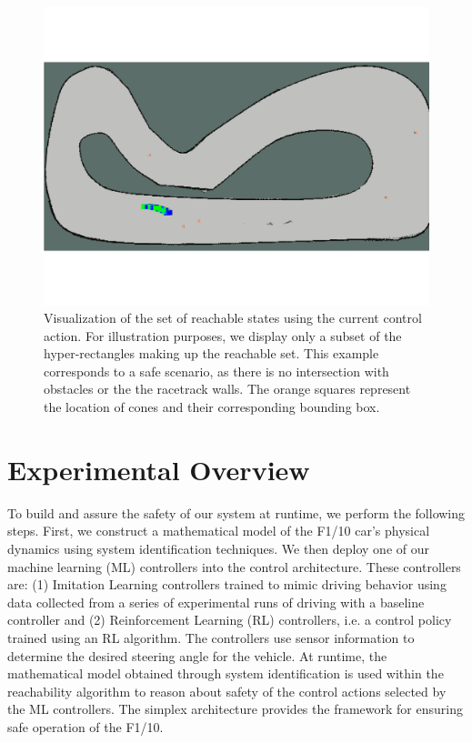 \documentclass[manuscript,screen,review]{acmart}
\begin{document}
\begin{figure}[htpb]%
  \centering
    \includegraphics[width=0.75\linewidth]{figures/viz_option_two.pdf}
   \caption{Visualization of the set of reachable states using the current control action. For illustration purposes, we display only a subset of the hyper-rectangles making up the reachable set. This example corresponds to a safe scenario, as there is no intersection with obstacles or the the racetrack walls. The orange squares represent the location of cones and their corresponding bounding box.}
  \label{fig:reachset}
\end{figure}



\section{Experimental Overview}

To build and assure the safety of our system at runtime, we perform the following steps. First, we construct a mathematical model of the F1/10 car's physical dynamics using system identification techniques. We then deploy one of our machine learning (ML) controllers into the control architecture. These controllers are: (1) Imitation Learning controllers trained to mimic driving behavior using data collected from a series of experimental runs of driving with a baseline controller and (2) Reinforcement Learning (RL) controllers, i.e. a control policy trained using an RL algorithm. The controllers use sensor information to determine the desired steering angle for the vehicle. At runtime, the mathematical model obtained through system identification is used within the reachability algorithm to reason about safety of the control actions selected by the ML controllers. The simplex architecture provides the framework for ensuring safe operation of the F1/10.
\end{document}
